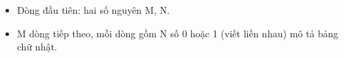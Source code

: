 \begin{itemize}
	\item     Dòng đầu tiên: hai số nguyên M, N.   
	\item     M dòng tiếp theo, mỗi dòng gồm N số 0 hoặc 1 (viết liền nhau) mô tả bảng chữ nhật.    


\end{itemize}